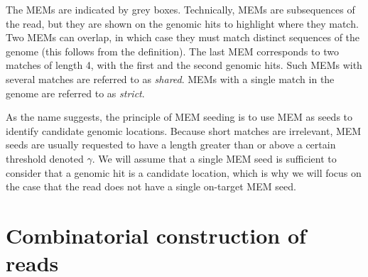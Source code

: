 \documentclass{article}
\begin{document}
The MEMs are indicated by grey boxes. Technically, MEMs are subsequences
of the read, but they are shown on the genomic hits to highlight where
they match. Two MEMs can overlap, in which case they must match distinct
sequences of the genome (this follows from the definition). The last MEM
corresponds to two matches of length 4, with the first and the second
genomic hits. Such MEMs with several matches are referred to as
\emph{shared}. MEMs with a single match in the genome are referred to as
\emph{strict}.

As the name suggests, the principle of MEM seeding is to use MEM as seeds
to identify candidate genomic locations. Because short matches are
irrelevant, MEM seeds are usually requested to have a length greater than
or above a certain threshold denoted $\gamma$. We will assume that a
single MEM seed is sufficient to consider that a genomic hit is a
candidate location, which is why we will focus on the case that the read
does not have a single on-target MEM seed.

%
%


\section{Combinatorial construction of reads}
\end{document}
